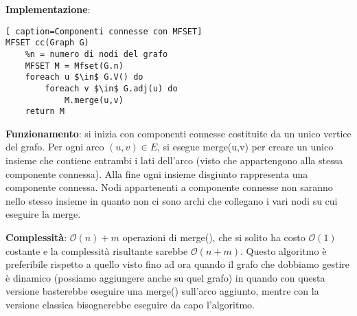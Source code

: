 \documentclass[../cheatSheetAlgoritmi.tex]{subfiles}
\begin{document}
\bigskip

\textbf{Implementazione}:
\begin{lstlisting}[ caption=Componenti connesse con MFSET]
MFSET cc(Graph G)
	%n = numero di nodi del grafo
	MFSET M = Mfset(G.n)
	foreach u $\in$ G.V() do
		foreach v $\in$ G.adj(u) do
			M.merge(u,v)
	return M
\end{lstlisting} 

\bigskip

\textbf{Funzionamento}: si inizia con componenti connesse costituite da un unico vertice del grafo. Per ogni arco $(u,v) \in E$, si esegue merge(u,v) per creare un unico insieme che contiene entrambi i lati dell'arco (visto che appartengono alla stessa componente connessa). Alla fine ogni insieme disgiunto rappresenta una componente connessa. Nodi appartenenti a componente connesse non saranno nello stesso insieme in quanto non ci sono archi che collegano i vari nodi su cui eseguire la merge.

\bigskip

\textbf{Complessità}: $\mathcal{O}(n) + m$ operazioni di merge(), che si solito ha costo $\mathcal{O}(1)$ costante e la complessità risultante sarebbe $\mathcal{O}(n+m)$. Questo algoritmo è preferibile rispetto a quello visto fino ad ora quando il grafo che dobbiamo gestire è dinamico (possiamo aggiungere anche su quel grafo) in quando con questa versione basterebbe eseguire una merge() sull'arco aggiunto, mentre con la versione classica bisognerebbe eseguire da capo l'algoritmo. 
\newpage
\end{document}
